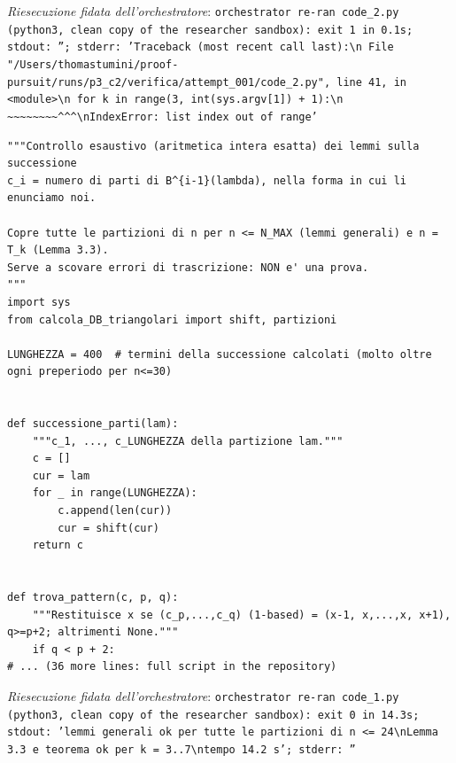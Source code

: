 \documentclass[11pt,a4paper]{article}
\begin{document}
\noindent\emph{Riesecuzione fidata dell'orchestratore}: \texttt{orchestrator re-ran code\_2.py (python3, clean copy of the researcher sandbox): exit 1 in 0.1s; stdout: ''; stderr: 'Traceback (most recent call last):\textbackslash{}n  File "/Users/thomastumini/proof-pursuit/runs/p3\_c2/verifica/attempt\_001/code\_2.py", line 41, in \textless{}module\textgreater{}\textbackslash{}n    for k in range(3, int(sys.argv[1]) + 1):\textbackslash{}n                          \textasciitilde{}\textasciitilde{}\textasciitilde{}\textasciitilde{}\textasciitilde{}\textasciitilde{}\textasciitilde{}\textasciitilde{}\textasciicircum{}\textasciicircum{}\textasciicircum{}\textbackslash{}nIndexError: list index out of range'}
\begin{lstlisting}[caption={attempt\_002 code\_1 [python, rigore exact] — Exhaustive exact check of OUR restatements of the lemmas of Part III (Lemma 4, x-patterns, — approvato dal Referee}]
"""Controllo esaustivo (aritmetica intera esatta) dei lemmi sulla successione
c_i = numero di parti di B^{i-1}(lambda), nella forma in cui li enunciamo noi.

Copre tutte le partizioni di n per n <= N_MAX (lemmi generali) e n = T_k (Lemma 3.3).
Serve a scovare errori di trascrizione: NON e' una prova.
"""
import sys
from calcola_DB_triangolari import shift, partizioni

LUNGHEZZA = 400  # termini della successione calcolati (molto oltre ogni preperiodo per n<=30)


def successione_parti(lam):
    """c_1, ..., c_LUNGHEZZA della partizione lam."""
    c = []
    cur = lam
    for _ in range(LUNGHEZZA):
        c.append(len(cur))
        cur = shift(cur)
    return c


def trova_pattern(c, p, q):
    """Restituisce x se (c_p,...,c_q) (1-based) = (x-1, x,...,x, x+1), q>=p+2; altrimenti None."""
    if q < p + 2:
# ... (36 more lines: full script in the repository)
\end{lstlisting}
\noindent\emph{Riesecuzione fidata dell'orchestratore}: \texttt{orchestrator re-ran code\_1.py (python3, clean copy of the researcher sandbox): exit 0 in 14.3s; stdout: 'lemmi generali ok per tutte le partizioni di n \textless{}= 24\textbackslash{}nLemma 3.3 e teorema ok per k = 3..7\textbackslash{}ntempo 14.2 s'; stderr: ''}
\end{document}
